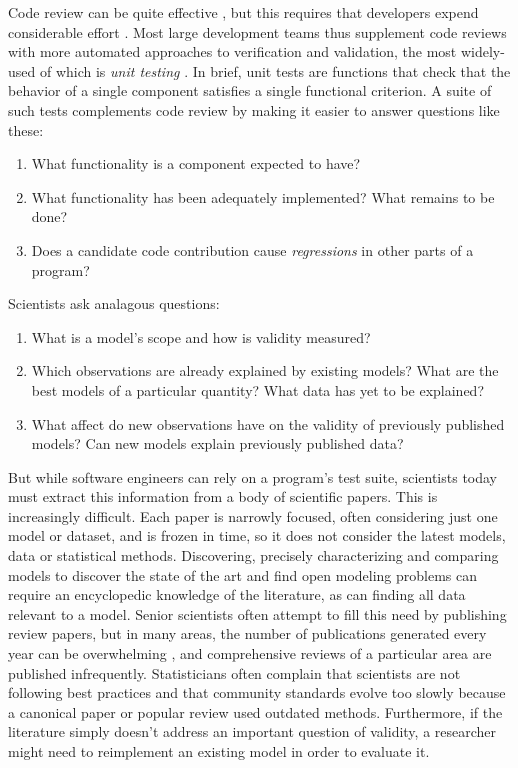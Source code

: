 \documentclass[9pt]{sig-alternate}
\begin{document}
Code review can be quite effective \cite{codereview}, but this requires that developers  expend considerable effort \cite{kemerer2009impact}. 
Most large development teams thus supplement code reviews with more {automated} approaches to verification and validation, the most widely-used  of which is \emph{unit testing} \cite{beck2003}. In brief, unit tests are functions that check that the behavior of a single component satisfies a single functional  criterion. 
A suite of such tests complements code review by making it easier to answer questions like these:
\begin{enumerate}
\item What functionality is a component expected to have?
\item What functionality has been adequately implemented? What remains to be done?
\item Does a candidate code contribution cause \emph{regressions} in other parts of a program?
\end{enumerate}
Scientists ask analagous questions:
\begin{enumerate}
\item What is a model's scope and how is validity measured?
\item Which observations are already explained by existing models? What are the best models of a particular quantity?  What data has yet to be explained?
\item What affect do new observations have on the validity of previously published models? Can new models explain previously published data?
\end{enumerate}
But while software engineers can rely on a program's test suite, scientists today must extract this information from a body of scientific papers. This is increasingly difficult. Each paper is narrowly focused, often considering just one model or dataset, and is frozen in time, so it does not consider the latest models, data or statistical methods. Discovering, precisely characterizing and comparing models to discover the state of the art and find open modeling problems can require an encyclopedic knowledge of the literature, as can finding all data relevant to a model. Senior scientists often attempt to fill this need by publishing review papers, but in many areas, the number of publications generated every year can be overwhelming \cite{jinha_article_2010}, and comprehensive reviews of a particular area are published infrequently. Statisticians often complain that scientists are not following best practices and that community standards evolve too slowly because a canonical paper or popular review used outdated methods. Furthermore, if the literature simply doesn't address an important question of validity, a researcher might need to reimplement an existing model in order to evaluate it. 
\end{document}
